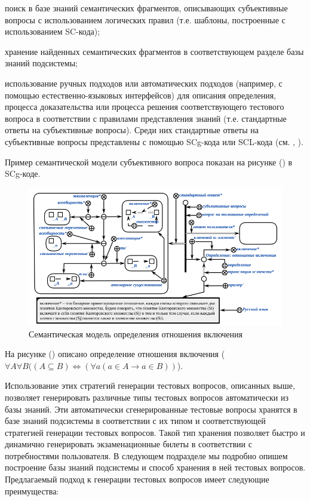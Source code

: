 \begin{textitemize}
	\item поиск в базе знаний семантических фрагментов, описывающих субъективные вопросы с использованием логических правил (т.е. шаблоны, построенные с использованием SC-кода);
	\item хранение найденных семантических фрагментов в соответствующем разделе базы знаний подсистемы;
	\item использование ручных подходов или автоматических подходов (например, с помощью естественно-языковых интерфейсов) для описания определения, процесса доказательства или процесса решения соответствующего тестового вопроса в соответствии с правилами представления знаний (т.е. стандартные ответы на субъективные вопросы). Среди них стандартные ответы на субъективные вопросы представлены с помощью SCg-кода или SCL-кода (см. , ). 
	
\end{textitemize}

Пример семантической модели субъективного вопроса показан на рисунке (\textit{}) в SCg-коде.

\begin{figure}[H]
	\includegraphics[scale=0.8]{author/part7/figures/DI_question_example.png}
	\caption{Семантическая модель определения отношения включения}
	\label{fig:DI_example}
\end{figure}

На рисунке (\textit{}) описано определение отношения включения ($\forall A\forall B((A\subseteq B)\Longleftrightarrow (\forall a(a\in A\rightarrow a\in B))$).

Использование этих стратегий генерации тестовых вопросов, описанных выше, позволяет генерировать различные типы тестовых вопросов автоматически из базы знаний. Эти автоматически сгенерированные тестовые вопросы хранятся в базе знаний подсистемы в соответствии с их типом и соответствующей стратегией генерации тестовых вопросов. Такой тип хранения позволяет быстро и динамично генерировать экзаменационные билеты в соответствии с потребностями пользователя. В следующем подразделе мы подробно опишем построение базы знаний подсистемы и способ хранения в ней тестовых вопросов. Предлагаемый подход к генерации тестовых вопросов имеет следующие преимущества:

